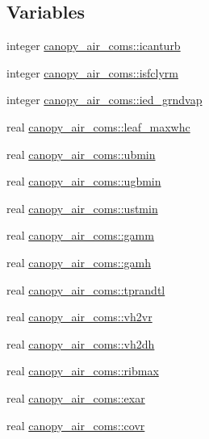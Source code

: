 \subsection*{Variables}
\begin{DoxyCompactItemize}
\item 
integer \hyperlink{namespacecanopy__air__coms_ad7c5174d5bc6bd090e9afff63a3428b4}{canopy\+\_\+air\+\_\+coms\+::icanturb}
\item 
integer \hyperlink{namespacecanopy__air__coms_a25351371b3a5e30c3cabd058d1153399}{canopy\+\_\+air\+\_\+coms\+::isfclyrm}
\item 
integer \hyperlink{namespacecanopy__air__coms_a1c11559607f1960e926e0e2adebdba1b}{canopy\+\_\+air\+\_\+coms\+::ied\+\_\+grndvap}
\item 
real \hyperlink{namespacecanopy__air__coms_aaaf296c47691fcf3aaab5b8929b37368}{canopy\+\_\+air\+\_\+coms\+::leaf\+\_\+maxwhc}
\item 
real \hyperlink{namespacecanopy__air__coms_ac8fd39daadba6dc58037eaf42f48700e}{canopy\+\_\+air\+\_\+coms\+::ubmin}
\item 
real \hyperlink{namespacecanopy__air__coms_a593e8ef887b3317fb55545892af84c50}{canopy\+\_\+air\+\_\+coms\+::ugbmin}
\item 
real \hyperlink{namespacecanopy__air__coms_a9a2322371ed4847814fa98174c092c12}{canopy\+\_\+air\+\_\+coms\+::ustmin}
\item 
real \hyperlink{namespacecanopy__air__coms_abb236f0b21abecb4efde793fd6a1811d}{canopy\+\_\+air\+\_\+coms\+::gamm}
\item 
real \hyperlink{namespacecanopy__air__coms_aec7b65c44519ebe9058cb6c4aa655e8c}{canopy\+\_\+air\+\_\+coms\+::gamh}
\item 
real \hyperlink{namespacecanopy__air__coms_adafee179c1e8ba89437987bc4be9b781}{canopy\+\_\+air\+\_\+coms\+::tprandtl}
\item 
real \hyperlink{namespacecanopy__air__coms_a2ac951854c77e1df16229f0fee8a70a6}{canopy\+\_\+air\+\_\+coms\+::vh2vr}
\item 
real \hyperlink{namespacecanopy__air__coms_ab7f6f46003b1ddabed2345c0ed33372d}{canopy\+\_\+air\+\_\+coms\+::vh2dh}
\item 
real \hyperlink{namespacecanopy__air__coms_a553bcc51d0af126ebd44094dae4cdeac}{canopy\+\_\+air\+\_\+coms\+::ribmax}
\item 
real \hyperlink{namespacecanopy__air__coms_a7ec65e87cc2c74a4f55e05e67272a5c0}{canopy\+\_\+air\+\_\+coms\+::exar}
\item 
real \hyperlink{namespacecanopy__air__coms_a8aa4d4dbd59143c45ab4c52fb326ecd6}{canopy\+\_\+air\+\_\+coms\+::covr}

\end{DoxyCompactItemize}
